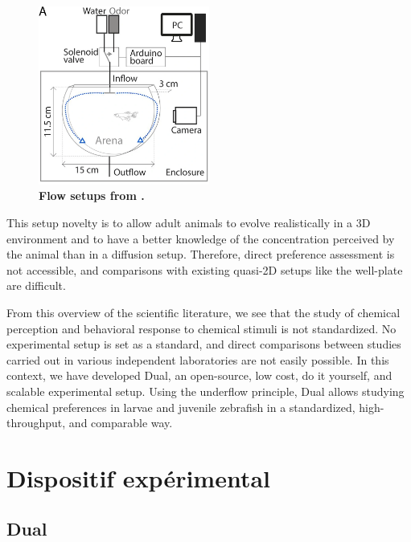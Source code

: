     \begin{figure}[h]
      \centering
      \includegraphics[width=0.5\textwidth]{part_2/assets/flow_1.png}
      \caption{\textbf{Flow setups from \cite{kermen2020stimulus}.}}
      \label{flow_1_setup}
    \end{figure}

    This setup novelty is to allow adult animals to evolve realistically in a 3D environment and to have a better knowledge of the concentration perceived by the animal than in a diffusion setup. Therefore, direct preference assessment is not accessible, and comparisons with existing quasi-2D setups like the well-plate are difficult.

    From this overview of the scientific literature, we see that the study of chemical perception and behavioral response to chemical stimuli is not standardized. No experimental setup is set as a standard, and direct comparisons between studies carried out in various independent laboratories are not easily possible. In this context, we have developed Dual, an open-source, low cost, do it yourself, and scalable experimental setup. Using the underflow principle, Dual allows studying chemical preferences in larvae and juvenile zebrafish in a standardized, high-throughput, and comparable way.

\iffalse
\chapter{Dispositif expérimental}

  \section{Dual}
